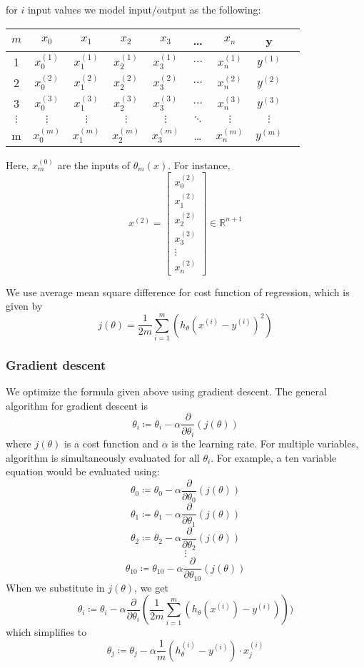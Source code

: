 for $i$ input values we model input/output as the following:
\begin{center}
\begin{tabular}{ |c|c|c|c|c|c|c|c|c| } 
\hline
$m$ & $x_0$ & $x_1$ & $x_2$ & $x_3$ & \dots & $x_n$ & y \\
\hline
1 & $x_0^{(1)}$ & $x_1^{(1)}$ & $x_2^{(1)}$ & $x_3^{(1)}$ & $\dots$ & $x_n^{(1)}$ & $y^{(1)}$\\ 
2 & $x_0^{(2)}$ & $x_1^{(2)}$ & $x_2^{(2)}$ & $x_3^{(2)}$ & $\dots$ & $x_n^{(2)}$ & $y^{(2)}$\\ 
3 & $x_0^{(3)}$ & $x_1^{(3)}$ & $x_2^{(3)}$ & $x_3^{(3)}$ & $\dots$ & $x_n^{(3)}$ & $y^{(3)}$\\ 
$\vdots$ & $\vdots$ & $\vdots$ & $\vdots$ & $\vdots$ & $\ddots$ & $\vdots$ & $\vdots$\\ 
m & $x_0^{(m)}$ & $x_1^{(m)}$ & $x_2^{(m)}$ & $x_3^{(m)}$ & \dots & $x_n^{(m)}$ & $y^{(m)}$\\ 
\hline
\end{tabular}
\end{center} 

Here, $x^{(0)}_m$ are the inputs of $\theta_m(x)$. For instance, 
$$x^{(2)} =  
\begin{bmatrix}
x_0^{(2)} \\
x_1^{(2)} \\
x_2^{(2)} \\
x_3^{(2)} \\
\vdots \\
x_n^{(2)}
\end{bmatrix}
\in \mathbb{R}^{n+1}
$$

We use average mean square difference for cost function of regression, which is given by
$$j(\theta) = \frac{1}{2m} \sum_{i=1}^{m} (h_{\theta}(x^{(i)} - y^{(i)})^{2})$$


\subsubsection{Gradient descent}
We optimize the formula given above using gradient descent.
The general algorithm for gradient descent is 
$$\theta_i \coloneqq \theta_i - \alpha \frac{\partial}{\partial \theta_i}(j(\theta))$$
where $j(\theta)$ is a cost function and $\alpha$ is the learning rate.
For multiple variables, algorithm is simultaneously evaluated for all $\theta_i$. 
For example, a ten variable equation would be evaluated using:
$$\theta_0 \coloneqq \theta_0 - \alpha \frac{\partial}{\partial \theta_0}(j(\theta))$$
$$\theta_1 \coloneqq \theta_1 - \alpha \frac{\partial}{\partial \theta_1}(j(\theta))$$
$$\theta_2 \coloneqq \theta_2 - \alpha \frac{\partial}{\partial \theta_2}(j(\theta))$$
$$\vdots$$
$$\theta_{10} \coloneqq \theta_{10} - \alpha \frac{\partial}{\partial \theta_{10}}(j(\theta))$$
When we substitute in $j(\theta)$, we get
$$\theta_i \coloneqq \theta_{i} - \alpha \frac{\partial}{\partial \theta_i}(\frac{1}{2m} \sum_{i=1}^m (h_{\theta}(x^{(i)}) - y^{(i)})))$$
which simplifies to
$$\theta_j \coloneqq  \theta_j - \alpha \frac{1}{m} (h_{\theta}^{(i)} - y^{(i)}) \cdot x_j^{(i)}$$

